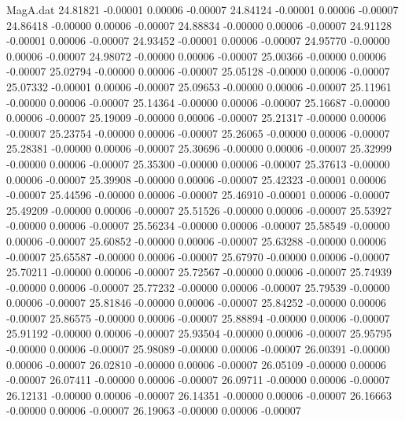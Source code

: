 \begin{filecontents}{MagA.dat}
  24.81821   -0.00001    0.00006   -0.00007
  24.84124   -0.00001    0.00006   -0.00007
  24.86418   -0.00000    0.00006   -0.00007
  24.88834   -0.00000    0.00006   -0.00007
  24.91128   -0.00001    0.00006   -0.00007
  24.93452   -0.00001    0.00006   -0.00007
  24.95770   -0.00000    0.00006   -0.00007
  24.98072   -0.00000    0.00006   -0.00007
  25.00366   -0.00000    0.00006   -0.00007
  25.02794   -0.00000    0.00006   -0.00007
  25.05128   -0.00000    0.00006   -0.00007
  25.07332   -0.00001    0.00006   -0.00007
  25.09653   -0.00000    0.00006   -0.00007
  25.11961   -0.00000    0.00006   -0.00007
  25.14364   -0.00000    0.00006   -0.00007
  25.16687   -0.00000    0.00006   -0.00007
  25.19009   -0.00000    0.00006   -0.00007
  25.21317   -0.00000    0.00006   -0.00007
  25.23754   -0.00000    0.00006   -0.00007
  25.26065   -0.00000    0.00006   -0.00007
  25.28381   -0.00000    0.00006   -0.00007
  25.30696   -0.00000    0.00006   -0.00007
  25.32999   -0.00000    0.00006   -0.00007
  25.35300   -0.00000    0.00006   -0.00007
  25.37613   -0.00000    0.00006   -0.00007
  25.39908   -0.00000    0.00006   -0.00007
  25.42323   -0.00001    0.00006   -0.00007
  25.44596   -0.00000    0.00006   -0.00007
  25.46910   -0.00001    0.00006   -0.00007
  25.49209   -0.00000    0.00006   -0.00007
  25.51526   -0.00000    0.00006   -0.00007
  25.53927   -0.00000    0.00006   -0.00007
  25.56234   -0.00000    0.00006   -0.00007
  25.58549   -0.00000    0.00006   -0.00007
  25.60852   -0.00000    0.00006   -0.00007
  25.63288   -0.00000    0.00006   -0.00007
  25.65587   -0.00000    0.00006   -0.00007
  25.67970   -0.00000    0.00006   -0.00007
  25.70211   -0.00000    0.00006   -0.00007
  25.72567   -0.00000    0.00006   -0.00007
  25.74939   -0.00000    0.00006   -0.00007
  25.77232   -0.00000    0.00006   -0.00007
  25.79539   -0.00000    0.00006   -0.00007
  25.81846   -0.00000    0.00006   -0.00007
  25.84252   -0.00000    0.00006   -0.00007
  25.86575   -0.00000    0.00006   -0.00007
  25.88894   -0.00000    0.00006   -0.00007
  25.91192   -0.00000    0.00006   -0.00007
  25.93504   -0.00000    0.00006   -0.00007
  25.95795   -0.00000    0.00006   -0.00007
  25.98089   -0.00000    0.00006   -0.00007
  26.00391   -0.00000    0.00006   -0.00007
  26.02810   -0.00000    0.00006   -0.00007
  26.05109   -0.00000    0.00006   -0.00007
  26.07411   -0.00000    0.00006   -0.00007
  26.09711   -0.00000    0.00006   -0.00007
  26.12131   -0.00000    0.00006   -0.00007
  26.14351   -0.00000    0.00006   -0.00007
  26.16663   -0.00000    0.00006   -0.00007
  26.19063   -0.00000    0.00006   -0.00007

\end{filecontents}
